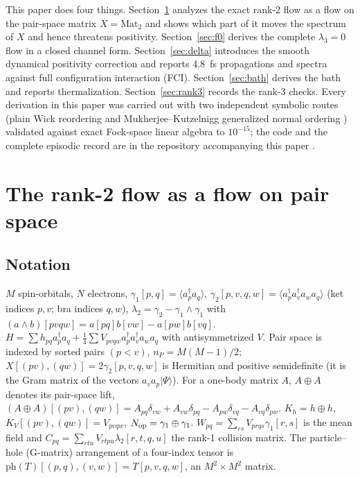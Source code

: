 \documentclass[aip,jcp,reprint,floatfix,superscriptaddress]{revtex4-2}
\newcommand{\Mat}{\mathrm{Mat}}
\newcommand{\ad}{a^\dagger}
\begin{document}
This paper does four things. Section~\ref{sec:structure} analyzes the exact rank-2 flow as a flow on the pair-space matrix $X=\Mat_2$ and shows which part of it moves the spectrum of $X$ and hence threatens positivity. Section~\ref{sec:f0} derives the complete $\lambda_3=0$ flow in a closed channel form. Section~\ref{sec:delta} introduces the smooth dynamical positivity correction and reports 4.8~fs propagations and spectra against full configuration interaction (FCI). Section~\ref{sec:bath} derives the bath and reports thermalization. Section~\ref{sec:rank3} records the rank-3 checks. Every derivation in this paper was carried out with two independent symbolic routes (plain Wick reordering and Mukherjee--Kutzelnigg generalized normal ordering \cite{kutzelnigg1997,mukherjee1997}) validated against exact Fock-space linear algebra to $10^{-15}$; the code and the complete episodic record are in the repository accompanying this paper \cite{repo}.

\section{The rank-2 flow as a flow on pair space}\label{sec:structure}

\subsection{Notation}
$M$ spin-orbitals, $N$ electrons, $\gamma_1[p,q]=\langle\ad_p a_q\rangle$, $\gamma_2[p,v,q,w]=\langle\ad_p\ad_v a_w a_q\rangle$ (ket indices $p,v$; bra indices $q,w$), $\lambda_2=\gamma_2-\gamma_1\wedge\gamma_1$ with $(a\wedge b)[pvqw]=a[pq]b[vw]-a[pw]b[vq]$. $H=\sum h_{pq}\ad_p a_q+\tfrac14\sum V_{pvqw}\ad_p\ad_v a_w a_q$ with antisymmetrized $V$. Pair space is indexed by sorted pairs $(p<v)$, $n_P=M(M-1)/2$; $X[(pv),(qw)]=2\gamma_2[p,v,q,w]$ is Hermitian and positive semidefinite (it is the Gram matrix of the vectors $a_v a_p|\Psi\rangle$). For a one-body matrix $A$, $A\oplus A$ denotes its pair-space lift, $(A\oplus A)[(pv),(qw)]=A_{pq}\delta_{vw}+A_{vw}\delta_{pq}-A_{pw}\delta_{vq}-A_{vq}\delta_{pw}$. $K_h=h\oplus h$, $K_V[(pv),(qw)]=V_{pvqw}$, $N_{\rm op}=\gamma_1\oplus\gamma_1$. $W_{pq}=\sum_{rs}V_{prqs}\gamma_1[r,s]$ is the mean field and $C_{pq}=\sum_{rtu}V_{rtpu}\lambda_2[r,t,q,u]$ the rank-1 collision matrix. The particle--hole (G-matrix) arrangement of a four-index tensor is $\mathrm{ph}(T)[(p,q),(v,w)]=T[p,v,q,w]$, an $M^2\times M^2$ matrix.
\end{document}
